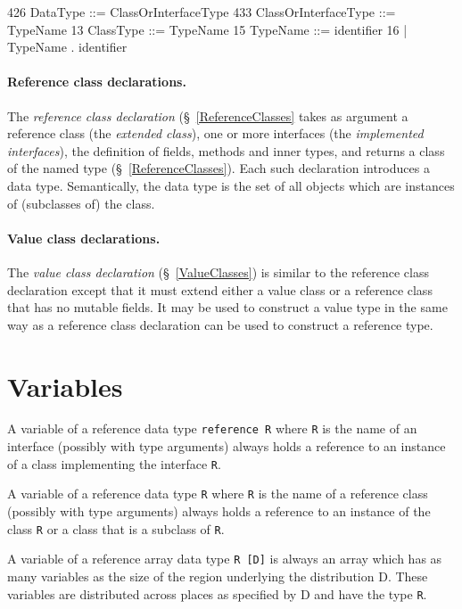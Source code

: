\begin{x10}
426   DataType ::= ClassOrInterfaceType
433   ClassOrInterfaceType ::= TypeName 
13    ClassType ::= TypeName
15    TypeName ::= identifier
16     | TypeName . identifier
\end{x10}

\paragraph{Reference class declarations.}\label{ReferenceTypes}
The {\em reference class declaration} (\S~\ref{ReferenceClasses} takes
as argument a reference class (the {\em extended class}), one or more
interfaces (the {\em implemented interfaces}), the definition of
fields, methods and inner types, and returns a class of the named type
(\S~\ref{ReferenceClasses}). Each such declaration introduces a data
type. Semantically, the data type is the set of all objects which are
instances of (subclasses of) the class.

\paragraph{Value class declarations.}
The {\em value class declaration} (\S~\ref{ValueClasses}) is
similar to the reference class declaration except that it must extend
either a value class or a reference class that has no mutable fields.
It may be used to construct a value type in the same way as a
reference class declaration can be used to construct a reference type.






\section{Variables}\label{XtenVariables}

A variable of a reference data type {\tt reference R} where {\tt R} is
the name of an interface (possibly with type arguments) always holds a
reference to an instance of a class implementing the interface {\tt R}.

A variable of a reference data type {\tt R} where {\tt R} is the name
of a reference class (possibly with type arguments) always holds a
reference to an instance of the class {\tt R} or a class that is a
subclass of {\tt R}. 

A variable of a reference array data type {\tt R [D]} is always an
array which has as many variables as the size of the region underlying
the distribution {\cf D}. These variables are distributed across
places as specified by {\cf D} and have the type {\tt R}.

